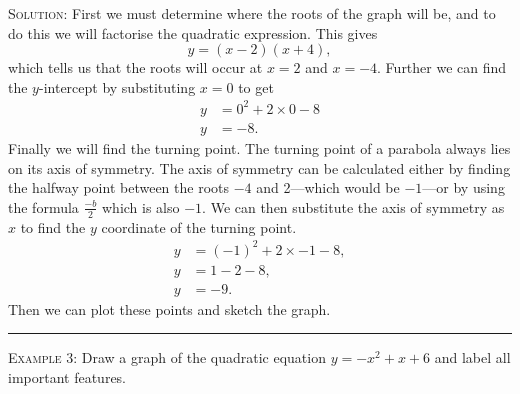 \documentclass[a4paper,12pt]{article}
\begin{document}
\textsc{Solution}: First we must determine where the roots of the graph will 
be, and to do this we will factorise the quadratic expression. This gives 
$$y = (x - 2)(x + 4),$$
which tells us that the roots will occur at $x = 2$ and $x = -4$. Further 
we can find the $y$-intercept by substituting $x=0$ to get
\begin{align*}
y &= 0^2 + 2\times 0 - 8 \\
y &= -8.
\end{align*}
Finally we will find the turning point. The turning point of a parabola 
always lies on its axis of symmetry. The axis of symmetry can be calculated 
either by finding the halfway point between the roots $-4$ and 2---which would 
be $-1$---or by using the formula $\frac{-b}{2}$ which is also $-1$. We can 
then substitute the axis of symmetry as $x$ to find the $y$ coordinate of the 
turning point.
\begin{align*}
y &= (-1)^2 + 2 \times -1 - 8, \\
y &= 1 - 2 - 8, \\
y &= -9.
\end{align*}
Then we can plot these points and sketch the graph.


\vspace{3mm}
\hrule
\vspace{3mm}

\textsc{Example 3}: Draw a graph of the quadratic equation $y = -x^2 + x + 6$
and label all important features.
\end{document}
